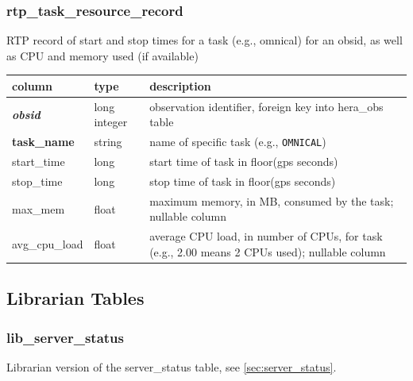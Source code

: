 \documentclass{article}
\begin{document}
{\subsubsection{rtp\_task\_resource\_record}
RTP record of start and stop times for a task (e.g., omnical) for an obsid, as well as CPU and memory used (if available)
\begin{center}
  \begin{tabular}{| p{4cm} | p{2cm} | p{10cm} |}
\hline
 column & type & description \\ [0.5ex] \hline\hline
\textit{\textbf{obsid}} & long integer & observation identifier, foreign key into hera\_obs table \\ \hline
\textbf{task\_name} & string & name of specific task (e.g., \verb+OMNICAL+) \\ \hline
start\_time & long & start time of task in floor(gps seconds) \\ \hline
stop\_time & long & stop time of task in floor(gps seconds) \\ \hline
max\_mem & float & maximum memory, in MB, consumed by the task; nullable column \\ \hline
avg\_cpu\_load & float & average CPU load, in number of CPUs, for task (e.g., 2.00 means 2 CPUs used); nullable column \\ \hline
\end{tabular}
\end{center}




\subsection{Librarian Tables}
\subsubsection{lib\_server\_status}
Librarian version of the server\_status table, see \ref{sec:server_status}.

}
\end{document}
